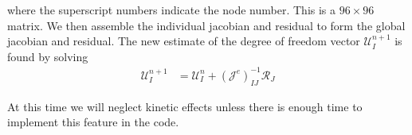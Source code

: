 where the superscript numbers indicate the node number. This is a $96 \times 96$ matrix. We then assemble the individual jacobian and residual to form the global jacobian and residual. The new estimate of the degree of freedom vector $\mathcal{U}_I^{n+1}$ is found by solving
\begin{align*}
\mathcal{U}_I^{n+1} &= \mathcal{U}_I^{n} + \left(\mathcal{J}^{e}\right)_{IJ}^{-1}\mathcal{R}_J
\end{align*}

At this time we will neglect kinetic effects unless there is enough time to implement this feature in the code.